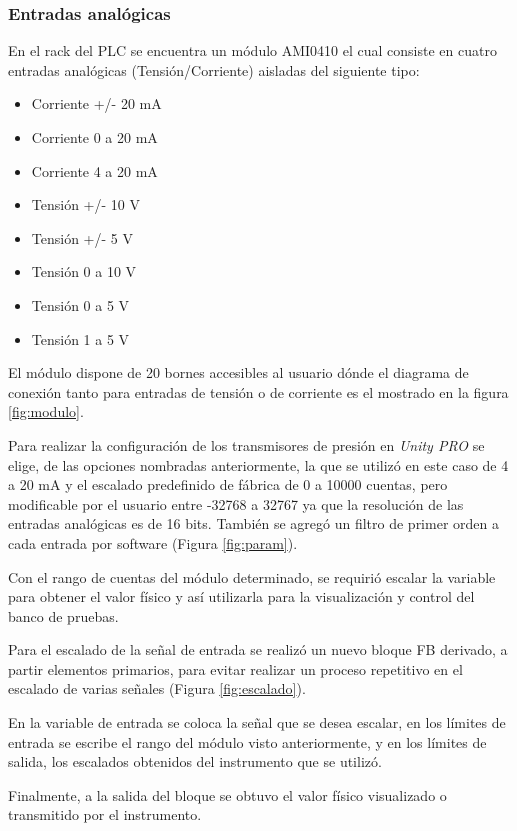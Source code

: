 \subsubsection{Entradas analógicas}
En el rack del PLC se encuentra un módulo AMI0410 el cual consiste en cuatro entradas analógicas (Tensión/Corriente) aisladas del siguiente tipo:
\begin{itemize}
	\item Corriente +/- 20 mA
\item 	Corriente 0 a 20 mA
\item 	Corriente 4 a 20 mA
\item 	Tensión +/- 10 V
\item 	Tensión +/- 5 V
\item 	Tensión 0 a 10 V
\item 	Tensión 0 a 5 V
\item 	Tensión 1 a 5 V
	
\end{itemize}

El módulo dispone de 20 bornes accesibles al usuario dónde el diagrama de conexión tanto para entradas de tensión o de corriente es el mostrado en la figura \ref{fig:modulo}.

Para realizar la configuración de los transmisores de presión en \textit{Unity PRO} se elige, de las opciones nombradas anteriormente, la que se utilizó en este caso de 4 a 20 mA y el escalado predefinido de fábrica de 0 a 10000 cuentas, pero modificable por el usuario entre -32768 a 32767 ya que la resolución de las entradas analógicas es de 16 bits. También se agregó un filtro de primer orden a cada entrada por software (Figura \ref{fig:param}).

Con el rango de cuentas del módulo determinado, se requirió escalar la variable para obtener el valor físico y así utilizarla para la visualización y control del banco de pruebas.

Para el escalado de la señal de entrada se realizó un nuevo bloque FB derivado, a partir elementos primarios, para evitar realizar un proceso repetitivo en el escalado de varias señales (Figura \ref{fig:escalado}).

En la variable de entrada se coloca la señal que se desea escalar, en los límites de entrada se escribe el rango del módulo visto anteriormente, y en los límites de salida, los escalados obtenidos del instrumento que se utilizó.

 Finalmente, a la salida del bloque se obtuvo el valor físico visualizado o transmitido por el instrumento.

